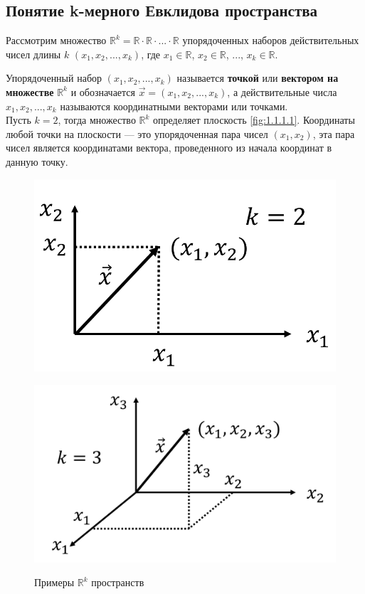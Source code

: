 \subsection{Понятие k-мерного Евклидова пространства} \label{sec:1.1}

Рассмотрим множество $\displaystyle \mathbb{R}^k = \mathbb{R \cdot R \cdot ... \cdot R}$ упорядоченных наборов действительных чисел длины $k$ $(x_1, x_2, ..., x_k)$, где $x_1 \in \mathbb R$, $x_2 \in \mathbb R$, ..., $x_k \in \mathbb R$.

Упорядоченный набор $(x_1, x_2, ..., x_k)$ называется \textbf{точкой} или \textbf{вектором на множестве} $\mathbb{R}^k$ и обозначается $\vec{x} = (x_1, x_2, ..., x_k)$, а действительные числа $x_1, x_2, ..., x_k$ называются координатными векторами или точками.\\

Пусть $k=2$, тогда множество $\mathbb{R}^k$ определяет плоскость \cref{fig:1.1.1.1}. Координаты любой точки на плоскости — это упорядоченная пара чисел $(x_1, x_2)$, эта пара чисел является координатами вектора, проведенного из начала координат в данную точку.

\begin{figure}[H]
	\centering
	\begin{minipage}{0.45\linewidth}
		\centering
		\includegraphics[width=0.9\linewidth]{image/screenshot001.png}
		\label{fig:1.1.1.1}
	\end{minipage}
	\begin{minipage}{0.45\linewidth}
		\centering
		\includegraphics[width=0.9\linewidth]{image/screenshot006.png}
		\label{fig:1.1.1.2}
	\end{minipage}
	\caption{Примеры $\mathbb{R}^k$ пространств}
	\label{fig:1.1.1}
\end{figure}

